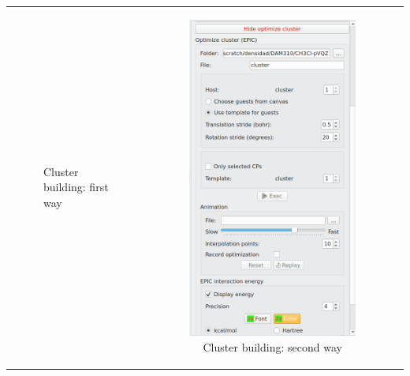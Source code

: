 \documentclass[10pt]{article}
\begin{document}
\begin{tabular}{lcr}
\begin{minipage}{.3\linewidth}
\begin{figure}[H]
\begin{center}
        \end{center}
        \vspace*{4mm}
        \caption{Cluster building: first way\label{fig:4_10_1}}
    \end{figure}
\end{minipage}
&
\begin{minipage}{.3\linewidth}
    \begin{figure}[H]
        \begin{center}
            \vspace*{0mm}
            \includegraphics[width=0.7\linewidth]{damqt320_mespimizer_2.png}
        \end{center}
        \vspace*{5mm}
        \caption{Cluster building: second way\label{fig:4_10_2}}
    \end{figure}
\end{minipage}
&
\begin{minipage}{.3\linewidth}

\end{minipage}
\end{tabular}
\end{document}
